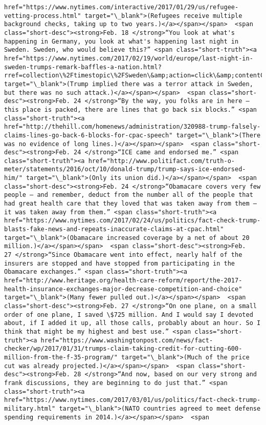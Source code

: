 \documentclass[11pt]{article}
\begin{document}
\begin{Verbatim}[commandchars=\\\{\}]
href="https://www.nytimes.com/interactive/2017/01/29/us/refugee-vetting-process.html" target="\_blank">(Refugees receive multiple background checks, taking up to two years.)</a></span></span>  <span class="short-desc"><strong>Feb. 18 </strong>“You look at what's happening in Germany, you look at what's happening last night in Sweden. Sweden, who would believe this?” <span class="short-truth"><a href="https://www.nytimes.com/2017/02/19/world/europe/last-night-in-sweden-trumps-remark-baffles-a-nation.html?rref=collection\%2Ftimestopic\%2FSweden\&amp;action=click\&amp;contentCollection=world\&amp;region=stream\&amp;module=stream\_unit\&amp;version=latest\&amp;contentPlacement=7\&amp;pgtype=collection" target="\_blank">(Trump implied there was a terror attack in Sweden, but there was no such attack.)</a></span></span>  <span class="short-desc"><strong>Feb. 24 </strong>“By the way, you folks are in here — this place is packed, there are lines that go back six blocks.” <span class="short-truth"><a href="http://thehill.com/homenews/administration/320988-trump-falsely-claims-lines-go-back-6-blocks-for-cpac-speech" target="\_blank">(There was no evidence of long lines.)</a></span></span>  <span class="short-desc"><strong>Feb. 24 </strong>“ICE came and endorsed me.” <span class="short-truth"><a href="http://www.politifact.com/truth-o-meter/statements/2016/oct/10/donald-trump/trump-says-ice-endorsed-him/" target="\_blank">(Only its union did.)</a></span></span>  <span class="short-desc"><strong>Feb. 24 </strong>“Obamacare covers very few people — and remember, deduct from the number all of the people that had great health care that they loved that was taken away from them — it was taken away from them.” <span class="short-truth"><a href="https://www.nytimes.com/2017/02/24/us/politics/fact-check-trump-blasts-fake-news-and-repeats-inaccurate-claims-at-cpac.html" target="\_blank">(Obamacare increased coverage by a net of about 20 million.)</a></span></span>  <span class="short-desc"><strong>Feb. 27 </strong>“Since Obamacare went into effect, nearly half of the insurers are stopped and have stopped from participating in the Obamacare exchanges.” <span class="short-truth"><a href="http://www.heritage.org/health-care-reform/report/the-2017-health-insurance-exchanges-major-decrease-competition-and-choice" target="\_blank">(Many fewer pulled out.)</a></span></span>  <span class="short-desc"><strong>Feb. 27 </strong>“On one plane, on a small order of one plane, I saved \$725 million. And I would say I devoted about, if I added it up, all those calls, probably about an hour. So I think that might be my highest and best use.” <span class="short-truth"><a href="https://www.washingtonpost.com/news/fact-checker/wp/2017/01/31/trumps-claim-taking-credit-for-cutting-600-million-from-the-f-35-program/" target="\_blank">(Much of the price cut was already projected.)</a></span></span>  <span class="short-desc"><strong>Feb. 28 </strong>“And now, based on our very strong and frank discussions, they are beginning to do just that.” <span class="short-truth"><a href="https://www.nytimes.com/2017/03/01/us/politics/fact-check-trump-military.html" target="\_blank">(NATO countries agreed to meet defense spending requirements in 2014.)</a></span></span>  <span 
\end{Verbatim}
\end{document}
